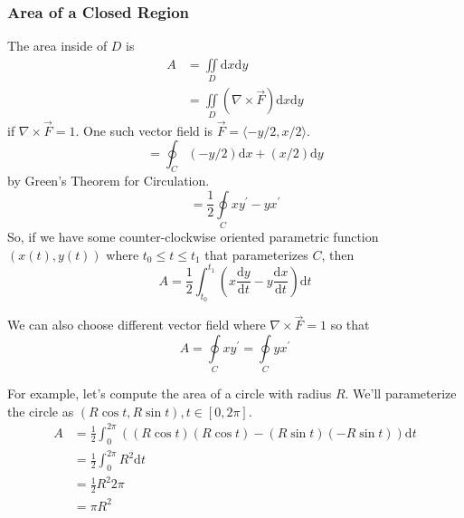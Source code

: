 \subsubsection{Area of a Closed Region}
\noindent
The area inside of $D$ is 
\begin{align*}
	A &= \iint\limits_{D}{\mathrm{d}x\mathrm{d}y} \\
	&= \iint\limits_{D}{\left(\nabla \times \vec{F}\right)\mathrm{d}x\mathrm{d}y}
\end{align*}
if $\nabla \times \vec{F} = 1$. One such vector field is $\vec{F} = \langle -y/2, x/2 \rangle$.
\begin{equation*}
	= \oint_{C}{(-y/2)\mathrm{d}x + (x/2)\mathrm{d}y}
\end{equation*}
by Green's Theorem for Circulation.
\begin{equation*}
	= \frac{1}{2}\oint\limits_{C}{xy^\prime - yx^\prime}	
\end{equation*}
So, if we have some counter-clockwise oriented parametric function $(x(t), y(t))$ where $t_0 \leq t \leq t_1$ that parameterizes $C$, then 
\begin{equation*}
	A = \frac{1}{2}\int_{t_0}^{t_1}{\left(x\frac{\mathrm{d}y}{\mathrm{d}t} - y\frac{\mathrm{d}x}{\mathrm{d}t}\right)\mathrm{d}t}
\end{equation*}

\noindent
We can also choose different vector field where $\nabla \times \vec{F} = 1$ so that
\begin{equation*}
	 A = \oint\limits_{C}{xy^\prime} = \oint\limits_{C}{yx^\prime}
\end{equation*}

\noindent
For example, let's compute the area of a circle with radius $R$.
We'll parameterize the circle as $(R\cos{t}, R\sin{t}), t \in [0,2\pi]$.\\
\begin{align*}
	A &= \frac{1}{2}\int_{0}^{2\pi}{((R\cos{t})(R\cos{t}) - (R\sin{t})(-R\sin{t}))\mathrm{d}t} \\
	&= \frac{1}{2}\int_{0}^{2\pi}{R^2\mathrm{d}t} \\
	&= \frac{1}{2}R^2 2\pi \\
	&= \pi R^2
\end{align*}